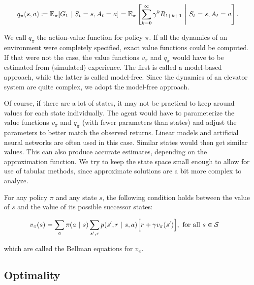 \begin{equation}
    q_\pi(s, a) \coloneqq \mathbb{E}_\pi[G_t \ |\  S_t = s, A_t = a] = \mathbb{E}_\pi\left[\sum_{k=0}^{\infty} \gamma^k R_{t+k+1} \ \Biggr\rvert\  S_t = s, A_t = a\right].
\end{equation}

We call $q_\pi$ the action-value function for policy $\pi$. If all the dynamics of an environment were completely specified, exact value functions could be computed. If that were not the case, the value functions $v_\pi$ and $q_\pi$ would have to be estimated from (simulated) experience. The first is called a model-based approach, while the latter is called model-free. Since the dynamics of an elevator system are quite complex, we adopt the model-free approach.

Of course, if there are a lot of states, it may not be practical to keep around values for each state individually. The agent would have to parameterize the value functions $v_\pi$ and $q_\pi$ (with fewer parameters than states) and adjust the parameters to better match the observed returns. Linear models and artificial neural networks are often used in this case. Similar states would then get similar values. This can also produce accurate estimates, depending on the approximation function. We try to keep the state space small enough to allow for use of tabular methods, since approximate solutions are a bit more complex to analyze.

For any policy $\pi$ and any state $s$, the following condition holds between the value of $s$ and the value of its possible successor states:

\begin{align}
    v_\pi(s) &= \sum_a \pi(a\ |\  s) \sum_{s', r} p(s', r \ |\  s, a)\Bigr[r + \gamma v_{\pi}(s')\Bigr], \text{ for all } s\in \mathcal{S} 
\end{align}

which are called the Bellman equations for $v_\pi$.

\subsection{Optimality}

